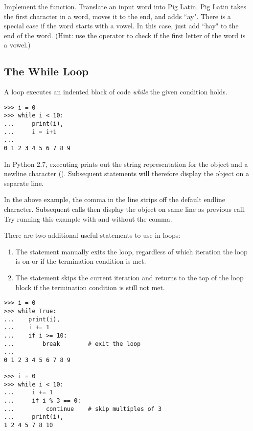 \begin{problem}
Implement the  function.
Translate an input word into Pig Latin.
Pig Latin takes the first character in a word, moves it to the end, and adds ``ay".
There is a special case if the word starts with a vowel.
In this case, just add ``hay" to the end of the word.
(Hint: use the  operator to check if the first letter of the word is a vowel.)
\end{problem}

\subsection*{The While Loop}
A  loop executes an indented block of code \emph{while} the given condition holds. 

\begin{lstlisting}
>>> i = 0
>>> while i < 10:        
...     print(i),            
...     i = i+1
...     
0 1 2 3 4 5 6 7 8 9
\end{lstlisting}

\begin{info} %
In Python 2.7, executing  prints out the string representation for the object  and a newline character (\li{\n}).
Subsequent  statements will therefore display the object on a separate line.

In the above example, the comma in the line  strips off the default endline character.
Subsequent calls then display the object on same line as previous call.
Try running this example with and without the comma.
\end{info}

There are two additional useful statements to use in loops:
\begin{enumerate}
\item The  statement manually exits the loop, regardless of which iteration the loop is on or if the termination condition is met.
\item The  statement skips the current iteration and returns to the top of the loop block if the termination condition is still not met.
\end{enumerate}

\begin{lstlisting}
>>> i = 0
>>> while True:
...    print(i),
...    i += 1
...    if i >= 10:
...        break        # exit the loop
...
0 1 2 3 4 5 6 7 8 9

>>> i = 0
>>> while i < 10:
...     i += 1
...     if i % 3 == 0:
...         continue    # skip multiples of 3
...     print(i),
1 2 4 5 7 8 10

\end{lstlisting}

